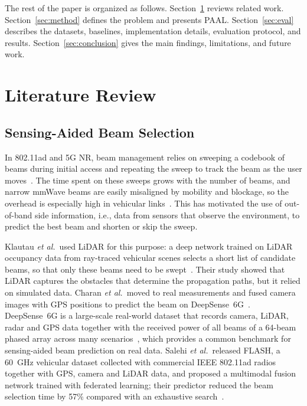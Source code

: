 \documentclass[journal,onecolumn]{IEEEtran}
\begin{document}
The rest of the paper is organized as follows. Section~\ref{sec:lit} reviews related work. Section~\ref{sec:method} defines the problem and presents PAAL. Section~\ref{sec:eval} describes the datasets, baselines, implementation details, evaluation protocol, and results. Section~\ref{sec:conclusion} gives the main findings, limitations, and future work.

\section{Literature Review}
\label{sec:lit}

\subsection{Sensing-Aided Beam Selection}
In 802.11ad and 5G NR, beam management relies on sweeping a codebook of beams during initial access and repeating the sweep to track the beam as the user moves~\cite{giordani2019tutorial}. The time spent on these sweeps grows with the number of beams, and narrow mmWave beams are easily misaligned by mobility and blockage, so the overhead is especially high in vehicular links~\cite{heath2016overview,giordani2019tutorial}. This has motivated the use of out-of-band side information, i.e., data from sensors that observe the environment, to predict the best beam and shorten or skip the sweep.

Klautau \emph{et al.}\ used LiDAR for this purpose: a deep network trained on LiDAR occupancy data from ray-traced vehicular scenes selects a short list of candidate beams, so that only these beams need to be swept~\cite{klautau2019lidar}. Their study showed that LiDAR captures the obstacles that determine the propagation paths, but it relied on simulated data. Charan \emph{et al.}\ moved to real measurements and fused camera images with GPS positions to predict the beam on DeepSense~6G~\cite{charan2022vision}. DeepSense~6G is a large-scale real-world dataset that records camera, LiDAR, radar and GPS data together with the received power of all beams of a 64-beam phased array across many scenarios~\cite{alkhateeb2023deepsense}, which provides a common benchmark for sensing-aided beam prediction on real data. Salehi \emph{et al.}\ released FLASH, a 60~GHz vehicular dataset collected with commercial IEEE 802.11ad radios together with GPS, camera and LiDAR data, and proposed a multimodal fusion network trained with federated learning; their predictor reduced the beam selection time by 57\% compared with an exhaustive search~\cite{salehi2022flash}.
\end{document}
